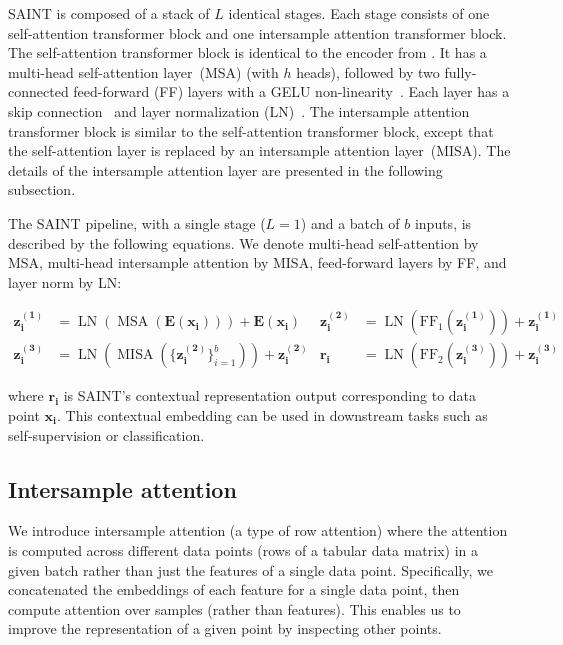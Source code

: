 SAINT is composed of a stack of $L$ identical stages. Each stage consists of one self-attention transformer block and one intersample attention transformer block. The self-attention transformer block is identical to the encoder from \cite{vaswani2017attention}. It has a multi-head self-attention layer~(MSA) (with $h$ heads), followed by two fully-connected feed-forward (FF) layers with a GELU non-linearity~\cite{hendrycks2016gaussian}. Each layer has a skip connection~\cite{he2016deep} and layer normalization (LN)~\cite{ba2016layer}. The intersample attention transformer block is similar to the self-attention transformer block, except that the self-attention layer is replaced by an intersample attention layer~(MISA). The details of the intersample attention layer are presented in the following subsection.

The SAINT pipeline, with a single stage ($L=1$) and a batch of $b$ inputs, is described by the following equations. We denote multi-head self-attention by MSA, multi-head intersample attention by MISA, feed-forward layers by FF, and layer norm by LN:

\begin{align}
    \mathbf{z_i^{(1)}} &= \operatorname{LN}(\operatorname{MSA}(\mathbf{E}(\mathbf{x_i}))) + \mathbf{E}(\mathbf{x_i}) & \mathbf{z_i^{(2)}} &= \operatorname{LN}(\operatorname{FF_1}(\mathbf{z_i^{(1)}})) +\mathbf{z_i^{(1)}}
    \label{eq:sa_block_apply} \\
    \mathbf{z_i^{(3)}} &= \operatorname{LN}(\operatorname{MISA}(\{\mathbf{z_i^{(2)}}\}_{i=1}^b)) +\mathbf{z_i^{(2)}} &  \mathbf{r_i}&= \operatorname{LN}(\operatorname{FF_2}(\mathbf{z_i^{(3)}})) +\mathbf{z_i^{(3)}}
    \label{eq:isa_block_apply} 

\end{align}

where $\mathbf{r_i}$ is SAINT's contextual representation output corresponding to data point $\mathbf{x_i}$. This contextual embedding can be used in downstream tasks such as self-supervision or classification.

\subsection{Intersample attention}
\label{subsec:ISA}

We introduce intersample attention (a type of row attention) where the attention is computed across different data points (rows of a tabular data matrix) in a given batch rather than just the features of a single data point. Specifically, we concatenated the embeddings of each feature for a single data point, then compute attention over samples (rather than features). This enables us to improve the representation of a given point by inspecting other points. 

